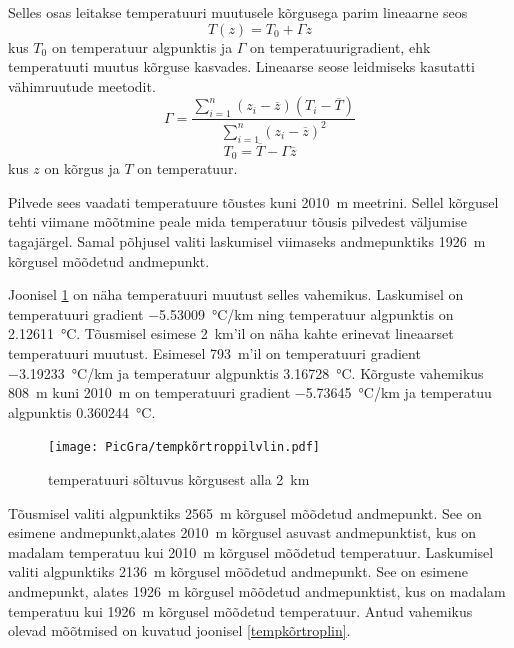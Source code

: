 \documentclass{trkut}%
\begin{document}
Selles osas leitakse temperatuuri muutusele kõrgusega parim lineaarne seos
\begin{equation*}
T(z) = T_0 + \Gamma z
\end{equation*}
kus $T_0$ on temperatuur algpunktis ja $\Gamma$ on temperatuurigradient, ehk temperatuuti muutus kõrguse kasvades. Lineaarse seose leidmiseks kasutatti vähimruutude meetodit.
\begin{equation*}
\Gamma = \frac{\sum_{i=1}^{n}(z_i - \overline{z})(T_i - \overline{T})}{\sum_{i=1}^{n}(z_i - \overline{z})^2}
\end{equation*}
\begin{equation*}
T_0 = \overline{T} - \Gamma \overline{z}
\end{equation*}
kus $z$ on kõrgus ja $T$ on temperatuur.

Pilvede sees vaadati temperatuure tõustes kuni  \SI{2010}{m} meetrini. Sellel kõrgusel tehti viimane mõõtmine peale mida temperatuur tõusis pilvedest väljumise tagajärgel. Samal põhjusel valiti laskumisel viimaseks andmepunktiks \SI{1926}{m} kõrgusel mõõdetud andmepunkt.

Joonisel \ref{tempkõrtroppilvlin} on näha temperatuuri muutust selles vahemikus. Laskumisel on temperatuuri gradient \SI{-5.53009}{\degreeCelsius/km} ning temperatuur algpunktis on \SI{2.12611}{\degreeCelsius}. Tõusmisel esimese \SI{2}{km}'il on näha kahte erinevat lineaarset temperatuuri muutust. Esimesel \SI{793}{m}'il on temperatuuri gradient \SI{-3.19233}{\degreeCelsius/km} ja temperatuur algpunktis \SI{3.16728}{\degreeCelsius}. Kõrguste vahemikus \SI{808}{m} kuni \SI{2010}{m} on temperatuuri gradient \SI{-5.73645}{\degreeCelsius/km} ja temperatuu algpunktis \SI{0.360244}{\degreeCelsius}.

\begin{figure}[h]
	\texttt{[image: PicGra/tempkõrtroppilvlin.pdf]}
	\caption{temperatuuri sõltuvus kõrgusest alla \SI{2}{km}}
	\label{tempkõrtroppilvlin}%
\end{figure}


Tõusmisel valiti algpunktiks \SI{2565}{m} kõrgusel mõõdetud andmepunkt. See on esimene andmepunkt,alates \SI{2010}{m} kõrgusel asuvast andmepunktist, kus on madalam temperatuu kui \SI{2010}{m} kõrgusel mõõdetud temperatuur. Laskumisel valiti algpunktiks \SI{2136}{m} kõrgusel mõõdetud andmepunkt. See on esimene andmepunkt, alates \SI{1926}{m} kõrgusel mõõdetud andmepunktist, kus on madalam temperatuu kui \SI{1926}{m} kõrgusel mõõdetud temperatuur. Antud vahemikus olevad mõõtmised on kuvatud joonisel \ref{tempkõrtroplin}.
\end{document}
